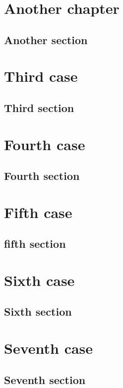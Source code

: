 \documentclass[twoside]{book}
\begin{document}
\lipsum[3-6]

\chapter{Another chapter}

\label{cha:another-chapter}

\lipsum

\section{Another section}

\lipsum[3-4]

\chapter{Third case}

\lipsum[1-2]

\section{Third section}

\lipsum

\chapter{Fourth case}

\lipsum[1-2]

\section{Fourth section}

\lipsum

\chapter{Fifth case}

\lipsum[1-2]

\section{fifth section}

\lipsum

\chapter{Sixth case}

\lipsum[1-2]

\section{Sixth section}

\lipsum

\chapter{Seventh case}

\lipsum[1-2]

\section{Seventh section}

\lipsum
\end{document}
